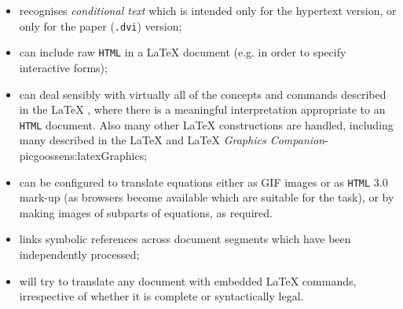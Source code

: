 \begin{itemize}
%
\item 
recognises \emph{conditional text}  which is intended only for
the hypertext version, or only for the paper (\texttt{.dvi}) version;\par
%
%
%
\item 
can include raw \texttt{HTML} in a \LaTeX{}  document 
(e.g. in order to specify interactive forms);

\label{hypcites}%
%
%
\item 
can deal sensibly with 
%
virtually all of the concepts and commands described in
the \LaTeX{} , 
where there is a meaningful interpretation appropriate to
an \texttt{HTML} document.
Also many other \LaTeX{} constructions are handled, including many described in the 
\LaTeX{} 
and \LaTeX{} %
{\textit{Graphics Companion}}{\Xy-pic}{goossens:latexGraphics};

%
%
%
%
%
%
\item 
can be configured to translate equations either
as GIF images or as \texttt{HTML} 3.0 mark-up
(as browsers become available which are suitable for the task),
or by making images of subparts of equations, as required.

%
%
\item 
links symbolic references across document segments which have been
independently processed;%

%
%
\item 
will try to translate any document with embedded \LaTeX{} commands, 
irrespective of whether it is complete or syntactically legal.

\end{itemize}









